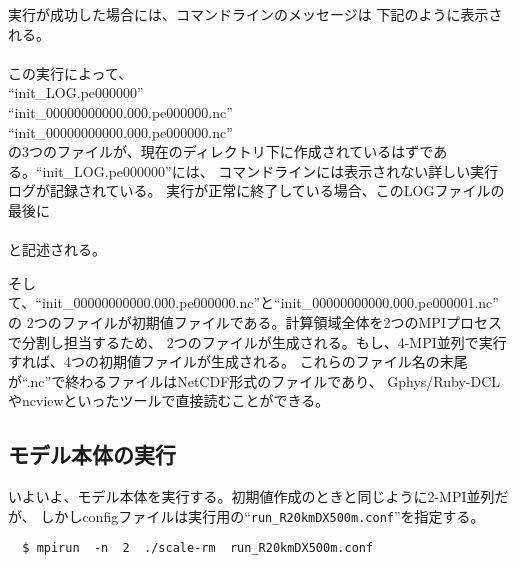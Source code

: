 \noindent 実行が成功した場合には、コマンドラインのメッセージは
下記のように表示される。\\

\\

\noindent この実行によって、\\
``init\_LOG.pe000000''\\
``init\_00000000000.000.pe000000.nc''\\
``init\_00000000000.000.pe000000.nc''\\
の3つのファイルが、現在のディレクトリ下に作成されているはずである。``init\_LOG.pe000000''には、
コマンドラインには表示されない詳しい実行ログが記録されている。
実行が正常に終了している場合、このLOGファイルの最後に\\

\\

\noindent と記述される。

そして、``init\_00000000000.000.pe000000.nc''と``init\_00000000000.000.pe000001.nc''の
2つのファイルが初期値ファイルである。計算領域全体を2つのMPIプロセスで分割し担当するため、
2つのファイルが生成される。もし、4-MPI並列で実行すれば、4つの初期値ファイルが生成される。
これらのファイル名の末尾が``.nc''で終わるファイルはNetCDF形式のファイルであり、
Gphys/Ruby-DCLやncviewといったツールで直接読むことができる。


\subsection{モデル本体の実行}
いよいよ、モデル本体を実行する。初期値作成のときと同じように2-MPI並列だが、
しかしconfigファイルは実行用の``\verb|run_R20kmDX500m.conf|''を指定する。
\begin{verbatim}
  $ mpirun  -n  2  ./scale-rm  run_R20kmDX500m.conf
\end{verbatim}

